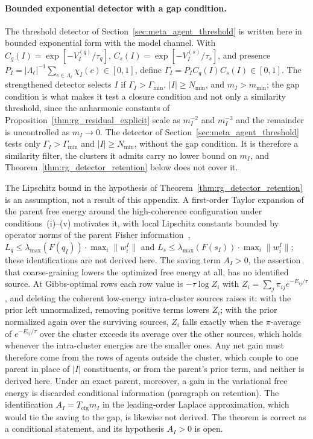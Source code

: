 \paragraph{Bounded exponential detector with a gap condition.}
The threshold detector of Section~\ref{sec:meta_agent_threshold} is written here in bounded exponential form with the model channel. With $C_q(I) = \exp[-V_I^{(q)}/\tau_q]$, $C_s(I) = \exp[-V_I^{(s)}/\tau_s]$, and presence $P_I = |\Lambda_\ell|^{-1}\sum_{c \in \Lambda_\ell}\chi_I(c) \in [0, 1]$, define $\Gamma_I = P_I C_q(I) C_s(I) \in [0, 1]$. The strengthened detector selects $I$ if $\Gamma_I > \Gamma_{\min}$, $|I| \ge N_{\min}$, and $m_I > m_{\min}$; the gap condition is what makes it test a closure condition and not only a similarity threshold, since the anharmonic constants of Proposition~\ref{thm:rg_residual_explicit} scale as $m_I^{-2}$ and $m_I^{-3}$ and the remainder is uncontrolled as $m_I \to 0$. The detector of Section~\ref{sec:meta_agent_threshold} tests only $\Gamma_I > \Gamma_{\min}$ and $|I| \ge N_{\min}$, without the gap condition. It is therefore a similarity filter, the clusters it admits carry no lower bound on $m_I$, and Theorem~\ref{thm:rg_detector_retention} below does not cover it.

\begin{remark}
\label{rem:rg_detector_saving}
The Lipschitz bound in the hypothesis of Theorem~\ref{thm:rg_detector_retention} is an assumption, not a result of this appendix. A first-order Taylor expansion of the parent free energy around the high-coherence configuration under conditions~(i)--(v) motivates it, with local Lipschitz constants bounded by operator norms of the parent Fisher information~\cite{Amari2016}, $L_q \le \lambda_{\max}(F(q_I)) \cdot \max_i\|w_i^I\|$ and $L_s \le \lambda_{\max}(F(s_I)) \cdot \max_i\|w_i^I\|$; these identifications are not derived here. The saving term $A_I>0$, the assertion that coarse-graining lowers the optimized free energy at all, has no identified source. At Gibbs-optimal rows each row value is $-\tau\log Z_i$ with $Z_i=\sum_j\pi_{ij}e^{-E_{ij}/\tau}$, and deleting the coherent low-energy intra-cluster sources raises it: with the prior left unnormalized, removing positive terms lowers $Z_i$; with the prior normalized again over the surviving sources, $Z_i$ falls exactly when the $\pi$-average of $e^{-E_{ij}/\tau}$ over the cluster exceeds its average over the other sources, which holds whenever the intra-cluster energies are the smaller ones. Any net gain must therefore come from the rows of agents outside the cluster, which couple to one parent in place of $|I|$ constituents, or from the parent's prior term, and neither is derived here. Under an exact parent, moreover, a gain in the variational free energy is discarded conditional information (paragraph on retention). The identification $A_I=T_{\mathrm{cfg}}m_I$ in the leading-order Laplace approximation, which would tie the saving to the gap, is likewise not derived. The theorem is correct as a conditional statement, and its hypothesis $A_I>0$ is open.
\end{remark}

